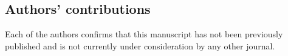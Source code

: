 \subsection{Authors' contributions}
Each of the authors confirms that this manuscript has not been previously published and is not currently under consideration by any other journal.




%
%
 




